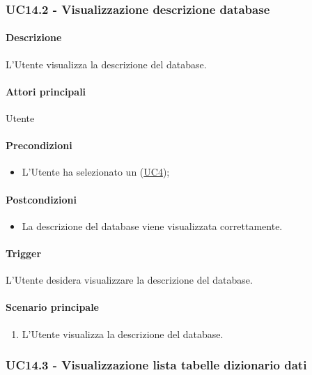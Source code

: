 \subsubsection{UC14.2 - Visualizzazione descrizione database}\label{UC14point2}
\paragraph*{Descrizione}
L'Utente visualizza la descrizione del database.

\paragraph*{Attori principali}
Utente

\paragraph*{Precondizioni}
\begin{itemize}
  \item L'Utente ha selezionato un  (\hyperref[UC4]{UC4});
\end{itemize}

\paragraph*{Postcondizioni}
\begin{itemize}
  \item La descrizione del database viene visualizzata correttamente.
\end{itemize}

\paragraph*{Trigger}
L'Utente desidera visualizzare la descrizione del database.

\paragraph*{Scenario principale}
\begin{enumerate}
  \item L'Utente visualizza la descrizione del database.
\end{enumerate}


\subsubsection{UC14.3 - Visualizzazione lista tabelle dizionario dati}\label{UC14point3}

